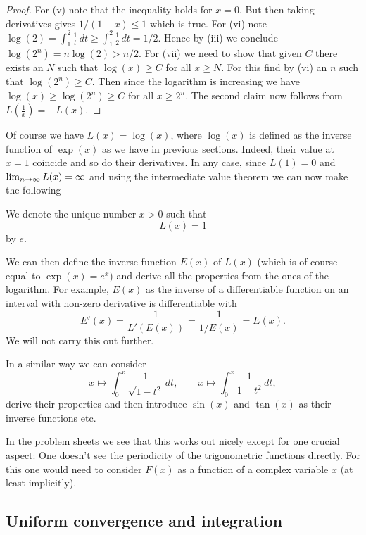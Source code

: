 \documentclass[10pt, a4paper]{article}
\begin{document}
\begin{theorem}
\begin{proof}
        For (v) note that the inequality holds for $x = 0$.
        But then taking derivatives gives $1 / (1 + x) \leq 1$ which is true.
        For (vi) note $\log(2) = \int_{1}^{2}\frac{1}{t}\,dt \geq \int_{1}^{2}\frac{1}{2}\,dt = 1 / 2$.
        Hence by (iii) we conclude $\log(2 ^ n) = n\log(2) > n / 2$.
        For (vii) we need to show that given $C$ there exists an $N$ such that $\log(x) \geq C$ for all $x \geq N$.
        For this find by (vi) an $n$ such that $\log(2 ^ n) \geq C$.
        Then since the logarithm is increasing we have $\log(x) \geq \log(2 ^ n) \geq C$ for all $x \geq 2 ^ n$.
        The second claim now follows from $L\left(\frac{1}{x}\right) = -L(x)$.
    \end{proof}
\end{theorem}

Of course we have $L(x) = \log(x)$,
where $\log(x)$ is defined as the inverse function of $\exp(x)$ as we have in previous sections.
Indeed,
their value at $x = 1$ coincide and so do their derivatives.
In any case,
since $L(1) = 0$ and $\lim_{n \rightarrow \infty} L(x) = \infty$ and using the intermediate value theorem we can now make the following
\begin{definition}
    We denote the unique number $x > 0$ such that
    \[
    L(x) = 1
    \]
    by $e$.
\end{definition}

We can then define the inverse function $E(x)$ of $L(x)$
(which is of course equal to $\exp(x) = e ^ x$)
and derive all the properties from the ones of the logarithm.
For example,
$E(x)$ as the inverse of a differentiable function on an interval with non-zero derivative is differentiable with
\[
E'(x) = \frac{1}{L'(E(x))} = \frac{1}{1 / E(x)} = E(x).
\]
We will not carry this out further.
\begin{remark}
    In a similar way we can consider
    \[
    x \mapsto \int_{0}^{x}\frac{1}{\sqrt{1 - t ^ 2}}\,dt,\qquad x \mapsto \int_{0}^{x}\frac{1}{1 + t ^ 2}\,dt,
    \]
    derive their properties and then introduce $\sin(x)$ and $\tan(x)$ as their inverse functions etc.

    In the problem sheets we see that this works out nicely except for one crucial aspect:
    One doesn't see the periodicity of the trigonometric functions directly.
    For this one would need to consider $F(x)$ as a function of a complex variable $x$
    (at least implicitly).
\end{remark}

\subsection{Uniform convergence and integration}
\end{document}
